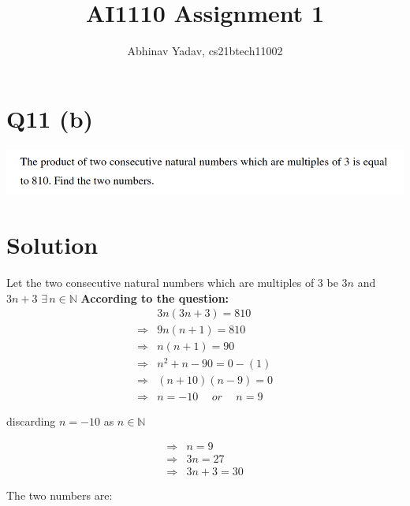 \documentclass[11pt]{article}
\title{AI1110 Assignment 1}
\author{Abhinav Yadav, cs21btech11002}
\begin{document}
    \maketitle
    \section*{Q11 (b)}
    \includegraphics[width=\textwidth]{q11_b.png}
    \section*{Solution}
    Let the two consecutive natural numbers which are multiples of $3$ be $3n$ and $3n+3$
    \hspace{5pt} $\exists \hspace{2pt} n \in \mathbb{N}$
    \textbf{According to the question:}\\
    \begin{align*}
        & 3n(3n+3) = 810\\
        \Rightarrow & 9n(n+1)=810\\
        \Rightarrow & n(n+1)=90\\
        \Rightarrow & n^2+n-90=0\hspace{0pt} -(1)\\
        \Rightarrow & (n+10)(n-9)=0\\
        \Rightarrow & n=-10 \hspace{15pt} or \hspace{15pt} n=9
    \end{align*}
    \begin{center}
        discarding $n=-10$ as $n \in \mathbb{N}$
    \end{center}
    \begin{equation*}
        \begin{split}
            \Rightarrow & n=9\\
            \Rightarrow & 3n=27\\
            \Rightarrow & 3n+3=30\\\\
        \end{split}
    \end{equation*} 
    The two numbers are:\\
    \\
\end{document}
